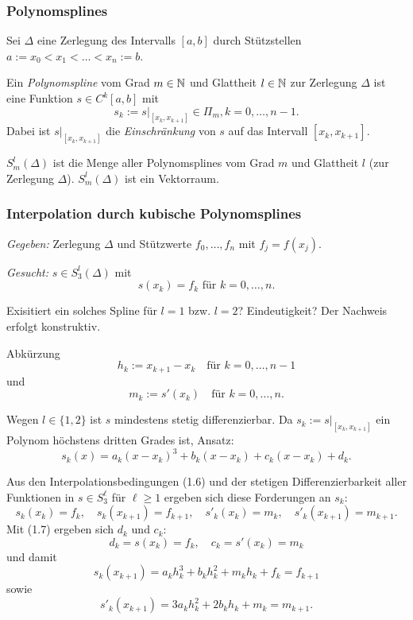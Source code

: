 \subsubsection{Polynomsplines}
Sei $\Delta$ eine Zerlegung des Intervalls $[a,b]$ durch Stützstellen $a := x_0 < x_1 < \ldots < x_n := b$.

\begin{defn}
 Ein \emph{Polynomspline} vom Grad $m \in \mathbb{N}$ und Glattheit $l \in \mathbb{N}$ zur Zerlegung $\Delta$ ist eine Funktion $s \in C^k[a,b]$ mit
 \[ s_k := s |_{[x_k,x_{k+1}]} \in \Pi_m, k = 0, \ldots, n-1. \]
 Dabei ist $s |_{[x_k,x_{k+1}]}$ die \emph{Einschränkung} von $s$ auf das Intervall $[x_k,x_{k+1}]$.
 
 $S_m^l(\Delta)$ ist die Menge aller Polynomsplines vom Grad $m$ und Glattheit $l$ (zur Zerlegung $\Delta$). $S_m^l(\Delta)$ ist ein Vektorraum.
\end{defn}

\subsubsection{Interpolation durch kubische Polynomsplines}
\emph{Gegeben:} Zerlegung $\Delta$ und Stützwerte $f_0, \ldots, f_n$ mit $f_j = f(x_j)$.

\emph{Gesucht:} $s \in S_3^l(\Delta)$ mit 
\begin{equation} s(x_k) = f_k \text{ für } k = 0, \ldots, n. \end{equation}

Exisitiert ein solches Spline für $l=1$ bzw. $l=2$? Eindeutigkeit? Der Nachweis erfolgt konstruktiv.

Abkürzung 
\[ h_k := x_{k+1} - x_k \quad \text{für } k = 0, \ldots, n-1 \]
und 
\[ m_k := s'(x_k) \quad \text{für } k = 0, \ldots, n. \]

Wegen $l \in \{ 1,2 \}$ ist $s$ mindestens stetig differenzierbar. Da $s_k := s|_{[x_k, x_{k+1}]}$ ein Polynom höchstens dritten Grades ist, Ansatz:
\begin{equation}
 s_k(x) = a_k (x-x_k)^3 + b_k (x-x_k) + c_k (x-x_k) + d_k.
\end{equation}

Aus den Interpolationsbedingungen (1.6) und der stetigen Differenzierbarkeit aller Funktionen in $s \in S_3^\ell$ für $\ell \ge 1$ ergeben sich diese Forderungen an $s_k$: 
\begin{equation}
 s_k(x_k) = f_k, \quad s_k(x_{k+1}) = f_{k+1}, \quad s'_k (x_k) = m_k, \quad s'_k (x_{k+1}) = m_{k+1}.
\end{equation}
Mit (1.7) ergeben sich $d_k$ und $c_k$:
\begin{equation}
 d_k = s(x_k) = f_k, \quad c_k = s'(x_k) = m_k
\end{equation}
und damit
\[ s_k( x_{k+1} ) = a_k h_k^3 + b_k h_k^2 + m_k h_k + f_k = f_{k+1} \]
sowie
\[ s'_k(x_{k+1}) = 3 a_k h_k^2 + 2 b_k h_k + m_k = m_{k+1}. \]

